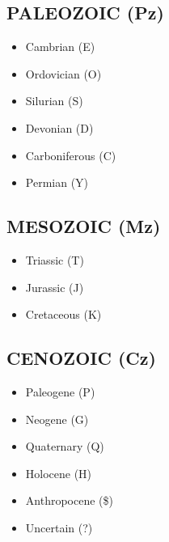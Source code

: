 \documentclass[letterpaper,10pt,english]{sphinxmanual}
\begin{document}
\subsection{PALEOZOIC (Pz)}
\label{\detokenize{legend:paleozoic-pz}}\begin{itemize}
\item {} 
Cambrian (E)

\item {} 
Ordovician (O)

\item {} 
Silurian (S)

\item {} 
Devonian (D)

\item {} 
Carboniferous (C)

\item {} 
Permian (Y)

\end{itemize}


\subsection{MESOZOIC (Mz)}
\label{\detokenize{legend:mesozoic-mz}}\begin{itemize}
\item {} 
Triassic (T)

\item {} 
Jurassic (J)

\item {} 
Cretaceous (K)

\end{itemize}


\subsection{CENOZOIC (Cz)}
\label{\detokenize{legend:cenozoic-cz}}\begin{itemize}
\item {} 
Paleogene (P)

\item {} 
Neogene (G)

\item {} 
Quaternary (Q)

\item {} 
Holocene (H)

\item {} 
Anthropocene (\$)

\item {} 
Uncertain (?)

\end{itemize}
\end{document}
